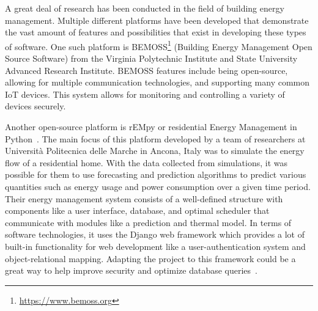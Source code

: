 \documentclass[conference]{IEEEtran}
\begin{document}


A great deal of research has been conducted in the field of building energy
management. Multiple different platforms have been developed that demonstrate
the vast amount of features and possibilities that exist in developing these
types of software. One such platform is
BEMOSS\footnote{\href{https://www.bemoss.org}{https://www.bemoss.org}} (Building
Energy Management Open Source Software) from the Virginia Polytechnic Institute
and State University Advanced Research Institute. BEMOSS features include being
open-source, allowing for multiple communication technologies, and supporting
many common IoT devices. This system allows for monitoring and controlling a
variety of devices securely.

Another open-source platform is rEMpy or residential Energy Management in
Python~\cite{FAGIANI2018131}. The main focus of this platform developed by a team of researchers at
Universit\`{a} Politecnica delle Marche in Ancona, Italy was to simulate the
energy flow of a residential home. With the data collected from simulations, it
was possible for them to use forecasting and prediction algorithms to predict
various quantities such as energy usage and power consumption over a given time period. Their energy management system consists of a well-defined structure with components like a user interface, database, and optimal scheduler that communicate with modules like a prediction and thermal model. In terms of software technologies, it uses the Django web framework which provides a lot of built-in functionality for web development like a user-authentication system and object-relational mapping. Adapting the project to this framework could be a great way to help improve security and optimize database queries~\cite{fagiani2017}.
\end{document}
